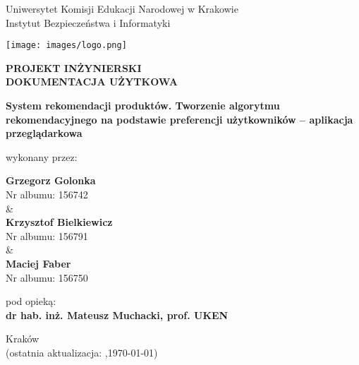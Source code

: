 \documentclass[12pt,a4paper,oneside]{article}
\theoremstyle{definition}
\numberwithin{equation}{section}
\begin{document}

\thispagestyle{empty} %
\begin{titlepage}
\begin{center}\Large
Uniwersytet Komisji Edukacji Narodowej w Krakowie\\
\large
Instytut Bezpieczeństwa i Informatyki\\
\vskip 10pt
\end{center}
\begin{center}
\centering \texttt{[image: images/logo.png]}
\end{center}

\begin{center}
 {\bf \fontsize{14pt}{14pt}\selectfont PROJEKT INŻYNIERSKI \\ DOKUMENTACJA UŻYTKOWA}
\end{center}
\vskip 5pt
\begin{center}
 {\bf \fontsize{15pt}{25pt}\selectfont System rekomendacji produktów. Tworzenie algorytmu rekomendacyjnego na
 podstawie preferencji użytkowników – aplikacja przeglądarkowa}
\end{center}

\begin{center}
 {\fontsize{12pt}{12pt}\selectfont wykonany przez: }
\end{center}
\begin{center}
 {\bf\fontsize{16pt}{16pt}\selectfont Grzegorz Golonka}\\
 {\fontsize{12pt}{12pt}\selectfont Nr albumu:  156742 \\\&\\}
 {\bf\fontsize{16pt}{16pt}\selectfont Krzysztof Bielkiewicz }\\
 {\fontsize{12pt}{12pt}\selectfont Nr albumu: 156791 \\\&\\}
 {\bf\fontsize{16pt}{16pt}\selectfont Maciej Faber }\\
 {\fontsize{12pt}{12pt}\selectfont Nr albumu: 156750}
\end{center}
\begin{center}
 {\fontsize{12pt}{12pt}\selectfont pod opieką:}\\
 {\bf\fontsize{12pt}{12pt}\selectfont dr hab. inż. Mateusz Muchacki, prof. UKEN }
\end{center}

\vspace*{\fill}
\begin{center}
\large
Kraków \the\year\\
(ostatnia aktualizacja: \DTMcurrenttime,\;\today)
\end{center}
\end{titlepage}
\setcounter{page}{0} 
\newpage\null\thispagestyle{empty}
\end{document}
